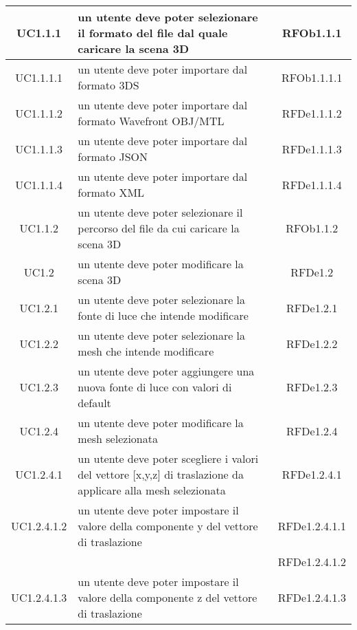 \begin{longtable}{|c|p{7cm}|c|}
\midrule
UC1.1.1
& un utente deve poter selezionare il formato del file dal quale caricare la scena 3D
& RFOb1.1.1 \\


\midrule
UC1.1.1.1
& un utente deve poter importare dal formato 3DS
& RFOb1.1.1.1 \\


\midrule
UC1.1.1.2
& un utente deve poter importare dal formato Wavefront OBJ/MTL
& RFDe1.1.1.2 \\


\midrule
UC1.1.1.3
& un utente deve poter importare dal formato JSON
& RFDe1.1.1.3 \\


\midrule
UC1.1.1.4
& un utente deve poter importare dal formato XML
& RFDe1.1.1.4 \\


\midrule
UC1.1.2
& un utente deve poter selezionare il percorso del file da cui caricare la scena 3D
& RFOb1.1.2 \\


\midrule
UC1.2
& un utente deve poter modificare la scena 3D
& RFDe1.2 \\


\midrule
UC1.2.1
& un utente deve poter selezionare la fonte di luce che intende modificare
& RFDe1.2.1 \\


\midrule
UC1.2.2
& un utente deve poter selezionare la mesh che intende modificare
& RFDe1.2.2 \\


\midrule
UC1.2.3
& un utente deve poter aggiungere una nuova fonte di luce con valori di default
& RFDe1.2.3 \\


\midrule
UC1.2.4
& un utente deve poter modificare la mesh selezionata
& RFDe1.2.4 \\


\midrule
UC1.2.4.1
& un utente deve poter scegliere i valori del vettore [x,y,z] di traslazione da applicare alla mesh selezionata
& RFDe1.2.4.1 \\


\midrule
UC1.2.4.1.2
& un utente deve poter impostare il valore della componente y del vettore di traslazione
& RFDe1.2.4.1.1 \\
& & RFDe1.2.4.1.2 \\


\midrule
UC1.2.4.1.3
& un utente deve poter impostare il valore della componente z del vettore di traslazione
& RFDe1.2.4.1.3 \\



\end{longtable}
